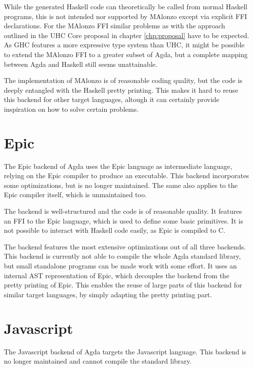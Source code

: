 \documentclass[12pt, a4paper, twoside]{report}
\begin{document}
While the generated Haskell
code can theoretically be called from normal Haskell programs, this is not intended nor supported
by MAlonzo except via explicit FFI declarations. For the MAlonzo FFI similar problems as with
the approach outlined in the UHC Core proposal in chapter \ref{chp:proposal} have to be expected.
As GHC features a more expressive type system than UHC,
it might be possible to extend the MAlonzo FFI to a greater subset of Agda, but a complete mapping
between Agda and Haskell still seems unattainable.

The implementation of MAlonzo is of reasonable coding quality, but the code is deeply entangled with the Haskell
pretty printing. This makes it hard to reuse this backend for other target languages, altough it can
certainly provide inspiration on how to solve certain problems.

\section{Epic}
The Epic backend \cite{fredriksson2011totaly} of Agda uses the Epic language \cite{Brady:2011:ELG:2362963.2362968} as intermediate
language, relying on the Epic compiler to produce an executable. This backend incorporates some optimizations, but is no longer
maintained. The same also applies to the Epic compiler itself, which is unmaintained too.

The backend is well-structured and the code is of reasonable quality. It features an FFI to the Epic language,
which is used to define some basic primitives. It is not possible to interact with Haskell code easily,
as Epic is compiled to C.

The backend features the most extensive optimizations out of all three backends. This backend is currently not able
to compile the whole Agda standard library, but small standalone programs can be made work with some effort. It
uses an internal AST representation of Epic, which decouples the backend from the pretty printing of Epic.
This enables the reuse of large parts of this backend for similar target languages, by simply adapting the pretty printing
part.


\section{Javascript}
The Javascript backend \cite{Jeffrey:2013:agda-js} of Agda targets the Javascript language. This backend
is no longer maintained and cannot compile the standard library.
\end{document}
